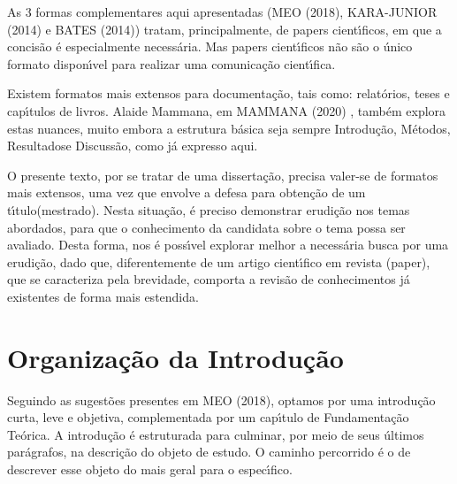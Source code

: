 \documentclass[
12pt,		%
openright,	%
twoside,  %
a4paper,			%
chapter=TITLE,		%
english,			%
french,				%
spanish,			%
brazil				%
]{USPSC-classe/USPSC_RedarTex}
\begin{document}
As 3 formas complementares aqui apresentadas (MEO (2018),  KARA-JUNIOR (2014) e BATES (2014)) tratam, principalmente, de papers cient\'{\i}ficos, em que a concis\~ao \'e especialmente necess\'aria. Mas papers cient\'{\i}ficos n\~ao s\~ao o \'unico formato dispon\'{\i}vel para realizar uma comunica\c{c}\~ao cient\'{\i}fica.










Existem formatos mais extensos para documenta\c{c}\~ao, tais como: relat\'orios, teses e cap\'{\i}tulos de livros. Alaide Mammana, em  MAMMANA (2020) , tamb\'em explora estas nuances, muito embora a estrutura b\'asica seja sempre \textquotedbl Introdu\c{c}\~ao\textquotedbl , \textquotedbl M\'etodos\textquotedbl , \textquotedbl Resultados\textquotedbl  e \textquotedbl Discuss\~ao\textquotedbl , como j\'a expresso aqui.










O presente texto, por se tratar de uma disserta\c{c}\~ao, precisa valer-se de formatos mais extensos, uma vez que envolve a \textquotedbl defesa para obten\c{c}\~ao de um t\'{\i}tulo\textquotedbl  (mestrado). Nesta situa\c{c}\~ao, \'e preciso demonstrar erudi\c{c}\~ao nos temas abordados, para que o conhecimento da candidata sobre o tema possa ser avaliado. Desta forma, nos \'e poss\'{\i}vel explorar melhor a necess\'aria busca por uma erudi\c{c}\~ao, dado que, diferentemente de um artigo cient\'{\i}fico em revista (\textquotedbl paper\textquotedbl ), que se caracteriza pela brevidade,  comporta a revis\~ao de conhecimentos j\'a existentes de forma mais estendida.










\section[Organiza\c{c}\~ao da Introdu\c{c}\~ao]{Organiza\c{c}\~ao da Introdu\c{c}\~ao}\label{Organiza\c{c}\~ao da Introdu\c{c}\~ao}
Seguindo as sugest\~oes presentes em MEO (2018), optamos por uma introdu\c{c}\~ao curta, leve e objetiva, complementada por um cap\'{\i}tulo de \textquotedbl Fundamenta\c{c}\~ao Te\'orica\textquotedbl . A introdu\c{c}\~ao \'e estruturada para culminar, por meio de seus \'ultimos par\'agrafos, na descri\c{c}\~ao do objeto de estudo. O caminho percorrido \'e o de descrever esse objeto do mais geral para o espec\'{\i}fico.
\end{document}
